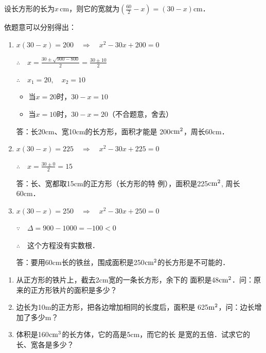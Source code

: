 \begin{figure}[htp]
    \centering
    \caption{}
\end{figure}

\begin{solution}
    设长方形的长为$x\,{\mathrm{cm}}$，则它的宽就为$\left(\frac{60}{2}-x\right)=(30-x)$cm．

    依题意可以分别得出：
\begin{enumerate}
    \item $x(30-x)=200\quad \Rightarrow\quad x^2-30x+200=0$

    $\therefore\quad x=\frac{30\pm \sqrt{900-800}}{2}=\frac{30\pm 10}{2}$

    $\therefore\quad x_1=20,\quad x_2=10$
\begin{itemize}
    \item 当$x=20$时，$30-x=10$
    \item 当$x=10$时，$30-x=20$（不合题意，舍去）
\end{itemize}

答：长20cm、宽10cm的长方形，面积才能是
200${\rm cm}^2$，周长60cm．

\item $x(30-x)=225\quad \Rightarrow\quad x^2-30x+225=0$

$\therefore\quad x=\frac{30\pm 0}{2}=15$

答：长、宽都取15cm的正方形（长方形的特
例），面积是225${\rm cm}^2$, 周长60cm．

\item $x(30-x)=250\quad \Rightarrow\quad x^2-30x+250=0$

$\because\quad \Delta =900-1000=-100<0$

$\therefore\quad $这个方程没有实数根．

答：要用60cm长的铁丝，围成面积是250${\rm cm}^2$的长方形是不可能的．
\end{enumerate}
\end{solution}

\begin{ex}
\begin{enumerate}
    \item 从正方形的铁片上，截去2cm宽的一条长方形，余下的
    面积是48${\rm cm}^2$．问：原来的正方形铁片的面积是多少？

    \item 边长为10m的正方形，把各边增加相同的长度后，面积是
625${\rm m}^2$，问：边长增加了多少m？
\item 体积是160${\rm cm}^3$的长方体，它的高是5cm，而它的长
是宽的五倍．试求它的长、宽各是多少？
\end{enumerate}
    
\end{ex}



